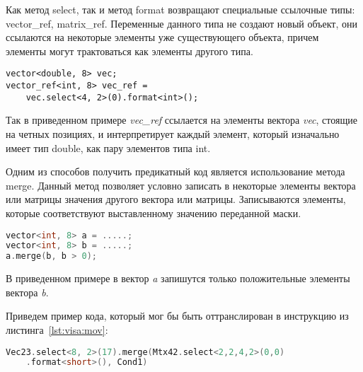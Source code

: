Как метод select, так и метод format возвращают специальные ссылочные типы: vector\_ref, matrix\_ref.
Переменные данного типа не создают новый объект, они ссылаются на некоторые элементы уже существующего объекта, причем элементы могут трактоваться как элементы другого типа.

\begin{lstlisting}
vector<double, 8> vec;
vector_ref<int, 8> vec_ref =
    vec.select<4, 2>(0).format<int>();
\end{lstlisting}

Так в приведенном примере \textit{vec\_ref} ссылается на элементы вектора \textit{vec}, стоящие на четных позициях, и интерпретирует каждый элемент, который изначально имеет тип double, как пару элементов типа int.

Одним из способов получить предикатный код является использование метода merge.
Данный метод позволяет условно записать в некоторые элементы вектора или матрицы значения другого вектора или матрицы.
Записываются элементы, которые соответствуют выставленному значению переданной маски.

\begin{lstlisting}[language=C++]
vector<int, 8> a = .....;
vector<int, 8> b = .....;
a.merge(b, b > 0);
\end{lstlisting}

В приведенном примере в вектор \textit{a} запишутся только положительные элементы вектора \textit{b}.

Приведем пример кода, который мог бы быть оттранслирован в инструкцию из листинга~\ref{lst:visa:mov}:

\begin{lstlisting}[language=C++]
Vec23.select<8, 2>(17).merge(Mtx42.select<2,2,4,2>(0,0)
    .format<short>(), Cond1)
\end{lstlisting}